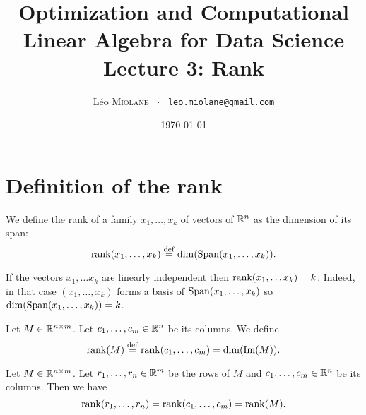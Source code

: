 \documentclass[11pt,nocut]{article}
\title{\vspace{-2.0cm}%
	Optimization and Computational Linear Algebra for Data Science\\
	Lecture 3: Rank}
\author{Léo \textsc{Miolane} \ $\cdot$ \ \texttt{leo.miolane@gmail.com}}
\date{\today}
\begin{document}
\maketitle



\section{Definition of the rank}

\begin{definition}
	We define the rank of a family $x_1, \dots, x_k$ of vectors of $\mathbb{R}^n$ as the dimension of its span:
	$$
	{{\rm rank}}(x_1, \dots, x_k) \overset{\rm def}{=} {{\rm dim}} ({{\rm Span}}(x_1, \dots, x_k)).
	$$
\end{definition}

If the vectors $x_1, \dots x_k$ are linearly independent then ${{\rm rank}}(x_1, \dots x_k) = k$. Indeed, in that case $(x_1, \dots, x_k)$ forms a basis of ${{\rm Span}}(x_1, \dots, x_k)$ so ${{\rm dim}}({{\rm Span}}(x_1, \dots, x_k)) = k$.


\begin{definition}\label{def:rank}
	Let $M \in \mathbb{R}^{n \times m}$. Let $c_1, \dots, c_m \in \mathbb{R}^n$ be its columns.
	We define
	\begin{equation}\label{eq:rank}
		{{\rm rank}}(M) \overset{\rm def}{=} {{\rm rank}}(c_1, \dots, c_m) = {{\rm dim}}({{\rm Im}}(M)).
	\end{equation}
\end{definition}

\begin{proposition}\label{prop:rank}
	Let $M \in \mathbb{R}^{n \times m}$. Let $r_1, \dots, r_n \in \mathbb{R}^m$ be the rows of $M$ and $c_1, \dots, c_m \in \mathbb{R}^n$ be its columns.
	Then we have
	\begin{equation}\label{eq:rank}
		{{\rm rank}}(r_1, \dots, r_n) = {{\rm rank}}(c_1, \dots, c_m) = {{\rm rank}}(M).
	\end{equation}
\end{proposition}


\end{document}
